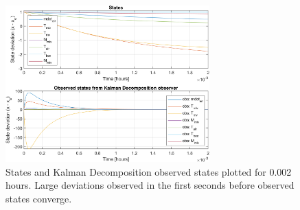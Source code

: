 \begin{figure}[h!]
	\centering
	\includegraphics[width=0.7\textwidth]{Graphics/fig_stateObsState002h.png}
	\caption{States and Kalman Decomposition observed states plotted for 0.002 hours. Large deviations observed in the first seconds before observed states converge.}
	\label{fig:sim_stateObsState002h}
\end{figure}
